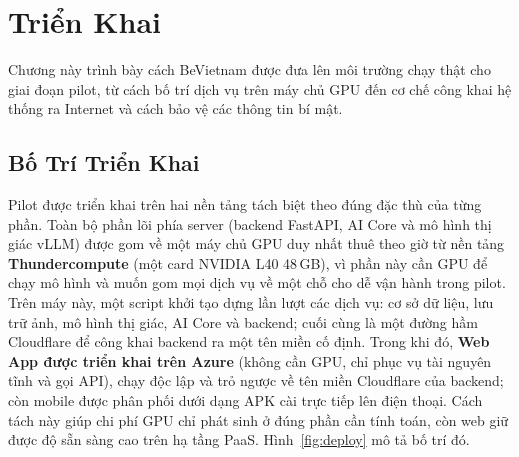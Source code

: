 \section{Triển Khai}

Chương này trình bày cách BeVietnam được đưa lên môi trường chạy thật cho
giai đoạn pilot, từ cách bố trí dịch vụ trên máy chủ GPU đến cơ chế công
khai hệ thống ra Internet và cách bảo vệ các thông tin bí mật.

\subsection{Bố Trí Triển Khai}
\contrib

Pilot được triển khai trên hai nền tảng tách biệt theo đúng đặc thù của
từng phần. Toàn bộ phần lõi phía server (backend FastAPI, AI Core và mô
hình thị giác vLLM) được gom về một máy chủ GPU duy nhất thuê theo giờ từ
nền tảng \textbf{Thundercompute} (một card NVIDIA L40 48\,GB), vì phần này
cần GPU để chạy mô hình và muốn gom mọi dịch vụ về một chỗ cho dễ vận
hành trong pilot. Trên máy này, một script khởi tạo dựng lần lượt các
dịch vụ: cơ sở dữ liệu, lưu trữ ảnh, mô hình thị giác, AI Core và backend;
cuối cùng là một đường hầm Cloudflare để công khai backend ra một tên
miền cố định. Trong khi đó, \textbf{Web App được triển khai trên Azure}
(không cần GPU, chỉ phục vụ tài nguyên tĩnh và gọi API), chạy độc lập và
trỏ ngược về tên miền Cloudflare của backend; còn mobile được phân phối
dưới dạng APK cài trực tiếp lên điện thoại. Cách tách này giúp chi phí
GPU chỉ phát sinh ở đúng phần cần tính toán, còn web giữ được độ sẵn sàng
cao trên hạ tầng PaaS. Hình~\ref{fig:deploy} mô tả bố trí đó.

